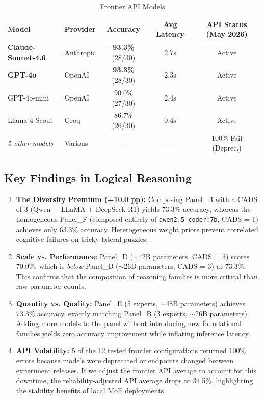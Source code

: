 \documentclass[11pt,a4paper]{article}
\begin{document}
\begin{table}[ht]
\centering
\footnotesize
\setlength{\tabcolsep}{3pt}
\caption{Frontier API Models}
\label{tab:frontier_api}
\begin{tabular}{llccc}
\toprule
\textbf{Model} & \textbf{Provider} & \textbf{Accuracy} & \textbf{Avg Latency} & \textbf{API Status (May 2026)} \\
\midrule
\textbf{Claude-Sonnet-4.6} & Anthropic & \textbf{93.3\%} (28/30) & 2.7s & Active \\
\textbf{GPT-4o} & OpenAI & \textbf{93.3\%} (28/30) & 2.3s & Active \\
GPT-4o-mini & OpenAI & 90.0\% (27/30) & 2.4s & Active \\
Llama-4-Scout & Groq & 86.7\% (26/30) & 0.4s & Active \\
\textit{5 other models} & Various & --- & --- & 100\% Fail (Deprec.) \\
\bottomrule
\end{tabular}
\end{table}

\subsection{Key Findings in Logical Reasoning}
\begin{enumerate}
    \item \textbf{The Diversity Premium (+10.0 pp):} Composing Panel\_B with a CADS of 3 (Qwen + LLaMA + DeepSeek-R1) yields 73.3\% accuracy, whereas the homogeneous Panel\_F (composed entirely of \texttt{qwen2.5-coder:7b}, CADS = 1) achieves only 63.3\% accuracy. Heterogeneous weight priors prevent correlated cognitive failures on tricky lateral puzzles.
    \item \textbf{Scale vs. Performance:} Panel\_D ($\sim$42B parameters, CADS = 3) scores 70.0\%, which is \textit{below} Panel\_B ($\sim$26B parameters, CADS = 3) at 73.3\%. This confirms that the composition of reasoning families is more critical than raw parameter counts.
    \item \textbf{Quantity vs. Quality:} Panel\_E (5 experts, $\sim$48B parameters) achieves 73.3\% accuracy, exactly matching Panel\_B (3 experts, $\sim$26B parameters). Adding more models to the panel without introducing new foundational families yields zero accuracy improvement while inflating inference latency.
    \item \textbf{API Volatility:} 5 of the 12 tested frontier configurations returned 100\% errors because models were deprecated or endpoints changed between experiment releases. If we adjust the frontier API average to account for this downtime, the reliability-adjusted API average drops to 34.5\%, highlighting the stability benefits of local MoE deployments.
\end{enumerate}
\end{document}
